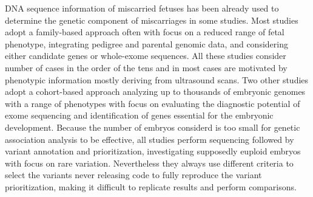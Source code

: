 DNA sequence information of miscarried fetuses has been already used to determine the genetic component of miscarriages in some studies.\cite{rajcan2020next, filges2015exome} Most studies adopt a family-based approach often with focus on a reduced range of fetal phenotype, integrating pedigree and parental genomic data, and considering either candidate genes\cite{bondeson2017nonsense, dohrn2015ecel1, wilbe2015musk, cristofoli2017novel, rae2015novel, thomas2012tctn3} or whole-exome %
sequences.\cite{shamseldin2015identification, qiao2016whole,fu2018whole, meier2019exome, yates2017whole}%
All these studies consider number of cases in the order of the tens and in most cases are motivated by phenotypic information mostly deriving from ultrasound scans. 
Two other studies adopt a cohort-based approach analyzing up to thousands of embryonic genomes with a range of phenotypes with focus on evaluating the diagnostic potential of exome sequencing\cite{zhao2020exome} and identification of genes essential for the embryonic development.\cite{chen2017characterization}
Because the number of embryos considerd is too small for genetic association analysis to be effective, all studies perform sequencing followed by variant annotation and prioritization, investigating supposedly euploid embryos with focus on rare variation. Nevertheless they always use different criteria to select the variants never releasing code to fully reproduce the variant prioritization, making it difficult to replicate results and perform comparisons.  



